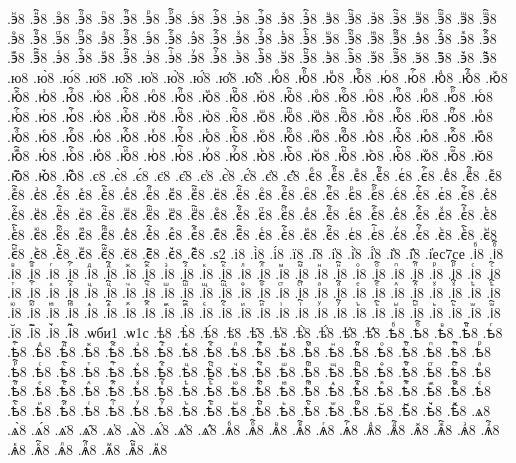 {.эⷩ8
.эⷩ҇8
.эⷪ8
.эⷪ҇8
.эⷫ8
.эⷫ҇8
.эⷬ8
.эⷬ҇8
.эⷭ8
.эⷭ҇8
.эⷮ8
.эⷮ҇8
.эⷯ8
.эⷯ҇8
.эⷰ8
.эⷰ҇8
.эⷱ8
.эⷱ҇8
.эⷲ8
.эⷲ҇8
.эⷳ8
.эⷳ҇8
.эⷴ8
.эⷴ҇8
.эⷵ8
.эⷵ҇8
.эⷶ8
.эⷶ҇8
.эⷷ8
.эⷷ҇8
.эⷸ8
.эⷸ҇8
.эⷹ8
.эⷹ҇8
.эⷺ8
.эⷺ҇8
.эⷻ8
.эⷻ҇8
.эⷼ8
.эⷼ҇8
.эⷽ8
.эⷽ҇8
.эⷾ8
.эⷾ҇8
.эⷿ8
.эⷿ҇8
.эꙴ8
.эꙴ҇8
.эꙵ8
.эꙵ҇8
.эꙶ8
.эꙶ҇8
.эꙷ8
.эꙷ҇8
.эꙸ8
.эꙸ҇8
.эꙹ8
.эꙹ҇8
.эꙺ8
.эꙺ҇8
.эꙻ8
.эꙻ҇8
.э꙼8
.э꙼҇8
.э꙽8
.э꙽҇8
.ю8
.ю̀8
.ю́8
.ю̈8
.ю̑8
.ю҆8
.ю҆̀8
.ю҆́8
.ю҆̈8
.ю҆̑8
.юⷠ8
.юⷠ҇8
.юⷡ8
.юⷡ҇8
.юⷢ8
.юⷢ҇8
.юⷣ8
.юⷣ҇8
.юⷤ8
.юⷤ҇8
.юⷥ8
.юⷥ҇8
.юⷦ8
.юⷦ҇8
.юⷧ8
.юⷧ҇8
.юⷨ8
.юⷨ҇8
.юⷩ8
.юⷩ҇8
.юⷪ8
.юⷪ҇8
.юⷫ8
.юⷫ҇8
.юⷬ8
.юⷬ҇8
.юⷭ8
.юⷭ҇8
.юⷮ8
.юⷮ҇8
.юⷯ8
.юⷯ҇8
.юⷰ8
.юⷰ҇8
.юⷱ8
.юⷱ҇8
.юⷲ8
.юⷲ҇8
.юⷳ8
.юⷳ҇8
.юⷴ8
.юⷴ҇8
.юⷵ8
.юⷵ҇8
.юⷶ8
.юⷶ҇8
.юⷷ8
.юⷷ҇8
.юⷸ8
.юⷸ҇8
.юⷹ8
.юⷹ҇8
.юⷺ8
.юⷺ҇8
.юⷻ8
.юⷻ҇8
.юⷼ8
.юⷼ҇8
.юⷽ8
.юⷽ҇8
.юⷾ8
.юⷾ҇8
.юⷿ8
.юⷿ҇8
.юꙴ8
.юꙴ҇8
.юꙵ8
.юꙵ҇8
.юꙶ8
.юꙶ҇8
.юꙷ8
.юꙷ҇8
.юꙸ8
.юꙸ҇8
.юꙹ8
.юꙹ҇8
.юꙺ8
.юꙺ҇8
.юꙻ8
.юꙻ҇8
.ю꙼8
.ю꙼҇8
.ю꙽8
.ю꙽҇8
.є8
.є̀8
.є́8
.є̈8
.є̑8
.є҆8
.є҆̀8
.є҆́8
.є҆̈8
.є҆̑8
.єⷠ8
.єⷠ҇8
.єⷡ8
.єⷡ҇8
.єⷢ8
.єⷢ҇8
.єⷣ8
.єⷣ҇8
.єⷤ8
.єⷤ҇8
.єⷥ8
.єⷥ҇8
.єⷦ8
.єⷦ҇8
.єⷧ8
.єⷧ҇8
.єⷨ8
.єⷨ҇8
.єⷩ8
.єⷩ҇8
.єⷪ8
.єⷪ҇8
.єⷫ8
.єⷫ҇8
.єⷬ8
.єⷬ҇8
.єⷭ8
.єⷭ҇8
.єⷮ8
.єⷮ҇8
.єⷯ8
.єⷯ҇8
.єⷰ8
.єⷰ҇8
.єⷱ8
.єⷱ҇8
.єⷲ8
.єⷲ҇8
.єⷳ8
.єⷳ҇8
.єⷴ8
.єⷴ҇8
.єⷵ8
.єⷵ҇8
.єⷶ8
.єⷶ҇8
.єⷷ8
.єⷷ҇8
.єⷸ8
.єⷸ҇8
.єⷹ8
.єⷹ҇8
.єⷺ8
.єⷺ҇8
.єⷻ8
.єⷻ҇8
.єⷼ8
.єⷼ҇8
.єⷽ8
.єⷽ҇8
.єⷾ8
.єⷾ҇8
.єⷿ8
.єⷿ҇8
.єꙴ8
.єꙴ҇8
.єꙵ8
.єꙵ҇8
.єꙶ8
.єꙶ҇8
.єꙷ8
.єꙷ҇8
.єꙸ8
.єꙸ҇8
.єꙹ8
.єꙹ҇8
.єꙺ8
.єꙺ҇8
.єꙻ8
.єꙻ҇8
.є꙼8
.є꙼҇8
.є꙽8
.є꙽҇8
.ѕ2
.і8
.і̀8
.і́8
.ї8
.і̑8
.і҆8
.і҆̀8
.і҆́8
.і҆̈8
.і҆̑8
.і҆ес7се
.іⷠ8
.іⷠ҇8
.іⷡ8
.іⷡ҇8
.іⷢ8
.іⷢ҇8
.іⷣ8
.іⷣ҇8
.іⷤ8
.іⷤ҇8
.іⷥ8
.іⷥ҇8
.іⷦ8
.іⷦ҇8
.іⷧ8
.іⷧ҇8
.іⷨ8
.іⷨ҇8
.іⷩ8
.іⷩ҇8
.іⷪ8
.іⷪ҇8
.іⷫ8
.іⷫ҇8
.іⷬ8
.іⷬ҇8
.іⷭ8
.іⷭ҇8
.іⷮ8
.іⷮ҇8
.іⷯ8
.іⷯ҇8
.іⷰ8
.іⷰ҇8
.іⷱ8
.іⷱ҇8
.іⷲ8
.іⷲ҇8
.іⷳ8
.іⷳ҇8
.іⷴ8
.іⷴ҇8
.іⷵ8
.іⷵ҇8
.іⷶ8
.іⷶ҇8
.іⷷ8
.іⷷ҇8
.іⷸ8
.іⷸ҇8
.іⷹ8
.іⷹ҇8
.іⷺ8
.іⷺ҇8
.іⷻ8
.іⷻ҇8
.іⷼ8
.іⷼ҇8
.іⷽ8
.іⷽ҇8
.іⷾ8
.іⷾ҇8
.іⷿ8
.іⷿ҇8
.іꙴ8
.іꙴ҇8
.іꙵ8
.іꙵ҇8
.іꙶ8
.іꙶ҇8
.іꙷ8
.іꙷ҇8
.іꙸ8
.іꙸ҇8
.іꙹ8
.іꙹ҇8
.іꙺ8
.іꙺ҇8
.іꙻ8
.іꙻ҇8
.і꙼8
.і꙼҇8
.і꙽8
.і꙽҇8
.ѡби1
.ѡ1с
.ѣ8
.ѣ̀8
.ѣ́8
.ѣ̈8
.ѣ̑8
.ѣ҆8
.ѣ҆̀8
.ѣ҆́8
.ѣ҆̈8
.ѣ҆̑8
.ѣⷠ8
.ѣⷠ҇8
.ѣⷡ8
.ѣⷡ҇8
.ѣⷢ8
.ѣⷢ҇8
.ѣⷣ8
.ѣⷣ҇8
.ѣⷤ8
.ѣⷤ҇8
.ѣⷥ8
.ѣⷥ҇8
.ѣⷦ8
.ѣⷦ҇8
.ѣⷧ8
.ѣⷧ҇8
.ѣⷨ8
.ѣⷨ҇8
.ѣⷩ8
.ѣⷩ҇8
.ѣⷪ8
.ѣⷪ҇8
.ѣⷫ8
.ѣⷫ҇8
.ѣⷬ8
.ѣⷬ҇8
.ѣⷭ8
.ѣⷭ҇8
.ѣⷮ8
.ѣⷮ҇8
.ѣⷯ8
.ѣⷯ҇8
.ѣⷰ8
.ѣⷰ҇8
.ѣⷱ8
.ѣⷱ҇8
.ѣⷲ8
.ѣⷲ҇8
.ѣⷳ8
.ѣⷳ҇8
.ѣⷴ8
.ѣⷴ҇8
.ѣⷵ8
.ѣⷵ҇8
.ѣⷶ8
.ѣⷶ҇8
.ѣⷷ8
.ѣⷷ҇8
.ѣⷸ8
.ѣⷸ҇8
.ѣⷹ8
.ѣⷹ҇8
.ѣⷺ8
.ѣⷺ҇8
.ѣⷻ8
.ѣⷻ҇8
.ѣⷼ8
.ѣⷼ҇8
.ѣⷽ8
.ѣⷽ҇8
.ѣⷾ8
.ѣⷾ҇8
.ѣⷿ8
.ѣⷿ҇8
.ѣꙴ8
.ѣꙴ҇8
.ѣꙵ8
.ѣꙵ҇8
.ѣꙶ8
.ѣꙶ҇8
.ѣꙷ8
.ѣꙷ҇8
.ѣꙸ8
.ѣꙸ҇8
.ѣꙹ8
.ѣꙹ҇8
.ѣꙺ8
.ѣꙺ҇8
.ѣꙻ8
.ѣꙻ҇8
.ѣ꙼8
.ѣ꙼҇8
.ѣ꙽8
.ѣ꙽҇8
.ѧ8
.ѧ̀8
.ѧ́8
.ѧ̈8
.ѧ̑8
.ѧ҆8
.ѧ҆̀8
.ѧ҆́8
.ѧ҆̈8
.ѧ҆̑8
.ѧⷠ8
.ѧⷠ҇8
.ѧⷡ8
.ѧⷡ҇8
.ѧⷢ8
.ѧⷢ҇8
.ѧⷣ8
.ѧⷣ҇8
.ѧⷤ8
.ѧⷤ҇8
.ѧⷥ8
.ѧⷥ҇8
.ѧⷦ8
.ѧⷦ҇8
.ѧⷧ8
.ѧⷧ҇8
.ѧⷨ8
.ѧⷨ҇8
.ѧⷩ8
}
